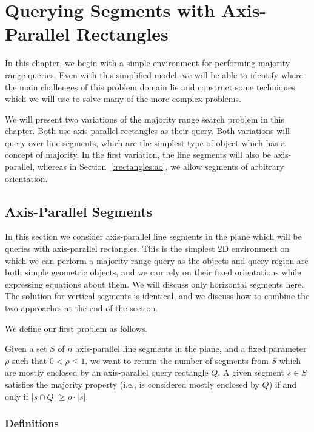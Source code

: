 \chapter{Querying Segments with Axis-Parallel Rectangles}
\label{:rectangles}

In this chapter, we begin with a simple environment for performing majority range queries. Even with this simplified model, we will be able to identify where the main challenges of this problem domain lie and construct some techniques which we will use to solve many of the more complex problems.

We will present two variations of the majority range search problem in this chapter. Both use axis-parallel rectangles as their query. Both variations will query over line segments, which are the simplest type of object which has a concept of majority. In the first variation, the line segments will also be axis-parallel, whereas in Section~\ref{:rectangles:ao}, we allow segments of arbitrary orientation.

\section{Axis-Parallel Segments}
\label{:rectangles:ap}

In this section we consider axis-parallel line segments in the plane which will be queries with axis-parallel rectangles.  This is the simplest 2D environment on which we can perform a majority range query as the objects and query region are both simple geometric objects, and we can rely on their fixed orientations while expressing equations about them. We will discuss only horizontal segments here.  The solution for vertical segments is identical, and we discuss how to combine the two approaches at the end of the section.

We define our first problem as follows.

\begin{problem}
Given a set $S$ of $n$ axis-parallel line segments in the plane, and a fixed parameter $\rho$ such that $0 < \rho \leq 1$, we want to return the number of segments from $S$ which are mostly enclosed by an axis-parallel query rectangle $Q$. A given segment $s \in S$ satisfies the majority property (i.e., is considered mostly enclosed by $Q$) if and only if $|s \cap Q| \geq \rho \cdot |s|$.
\end{problem}


\subsection{Definitions}
\label{:rectangles:ap:defs}

